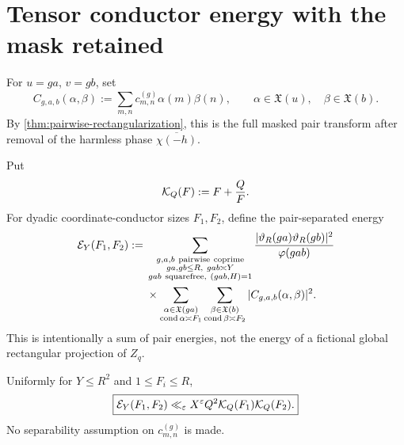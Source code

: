 \section{Tensor conductor energy with the mask retained}
\label{sec:tensor-energy}

For \(u=ga\), \(v=gb\), set
\begin{equation}
 C_{g,a,b}(\alpha,\beta)
 :=\sum_{m,n}c_{m,n}^{(g)}\alpha(m)\beta(n),
 \qquad
 \alpha\in\mathfrak X(u),\quad\beta\in\mathfrak X(b).
 \label{eq:rectangular-C}
\end{equation}
By \cref{thm:pairwise-rectangularization}, this is the full masked pair
transform after removal of the harmless phase
\(\overline{\chi(-h)}\).

Put
\begin{equation}
 \mathcal K_Q(F):=F+\frac QF.
 \label{eq:KQ}
\end{equation}
For dyadic coordinate-conductor sizes \(F_1,F_2\), define the
pair-separated energy
\begin{align}
 \mathcal E_Y(F_1,F_2)
 :={}&
 \sum_{\substack{g,a,b\ {\rm pairwise\ coprime}\\
                  ga,gb\le R,\ gab\asymp Y\\
                  gab\ {\rm squarefree},\ (gab,H)=1}}
 \frac{|\vartheta_R(ga)\vartheta_R(gb)|^2}{\varphi(gab)}
 \notag\\
 &\times
 \sum_{\substack{\alpha\in\mathfrak X(ga)\\\operatorname{cond}\alpha\asymp F_1}}
 \sum_{\substack{\beta\in\mathfrak X(b)\\\operatorname{cond}\beta\asymp F_2}}
 |C_{g,a,b}(\alpha,\beta)|^2.
 \label{eq:pair-energy}
\end{align}
This is intentionally a sum of pair energies, not the energy of a
fictional global rectangular projection of \(Z_q\).

\begin{theorem}
\label{thm:tensor-energy}
Uniformly for \(Y\le R^2\) and \(1\le F_i\le R\),
\begin{equation}
 \boxed{
 \mathcal E_Y(F_1,F_2)
 \ll_\varepsilon X^\varepsilon Q^2
 \mathcal K_Q(F_1)\mathcal K_Q(F_2).}
 \label{eq:tensor-energy-bound}
\end{equation}
No separability assumption on \(c_{m,n}^{(g)}\) is made.
\end{theorem}

